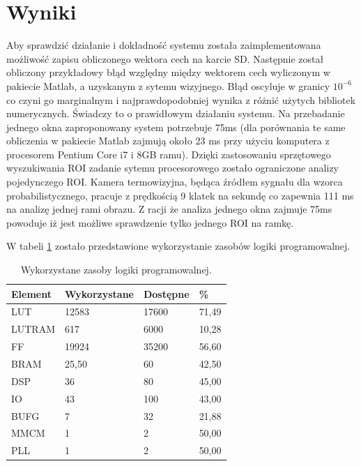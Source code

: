 \section{Wyniki}
Aby sprawdzić działanie i dokładność systemu została zaimplementowana możliwość zapisu obliczonego wektora cech na karcie SD. 
Następnie został obliczony przykładowy błąd względny między wektorem cech wyliczonym w pakiecie Matlab, a uzyskanym z sytemu wizyjnego. %
Błąd oscyluje w granicy \(10^{-6}\) co czyni go marginalnym i najprawdopodobniej wynika z różnić użytych bibliotek numerycznych. Świadczy to o prawidłowym działaniu systemu.
Na przebadanie jednego okna zaproponowany system potrzebuje 75ms  (dla porównania te same obliczenia w pakiecie Matlab zajmują około 23 ms przy użyciu komputera z procesorem Pentium Core i7 i 8GB ramu).
Dzięki zastosowaniu sprzętowego wyszukiwania ROI zadanie sytemu procesorowego zostało ograniczone analizy pojedynczego ROI.  %
Kamera termowizyjna, będąca źródłem sygnału dla wzorca probabilistycznego, pracuje z prędkością 9 klatek na sekundę co zapewnia 111 ms na analizę jednej rami obrazu. Z racji że analiza jednego okna zajmuje 75ms powoduje iż jest możliwe sprawdzenie tylko jednego ROI na ramkę. 

W tabeli \ref{tab:fpgautilization} zostało przedstawione wykorzystanie zasobów logiki programowalnej. 
\begin{table}[]
\centering
\caption{Wykorzystane zasoby logiki programowalnej.}
\label{tab:fpgautilization}
\begin{tabular}{|l|l|l|l|}
\hline
Element & Wykorzystane & Dostępne & \% \\ \hline %
LUT & 12583 & 17600 & 71,49 \\ \hline 
LUTRAM & 617 & 6000 & 10,28 \\ \hline 
FF & 19924 & 35200 & 56,60 \\ \hline
BRAM & 25,50 & 60 & 42,50 \\ \hline
DSP & 36 & 80 & 45,00 \\ \hline
IO & 43 & 100 & 43,00 \\ \hline
BUFG & 7 & 32 & 21,88 \\ \hline
MMCM & 1 & 2 & 50,00 \\ \hline
PLL & 1 & 2 & 50,00 \\ \hline
\end{tabular}
\end{table}

